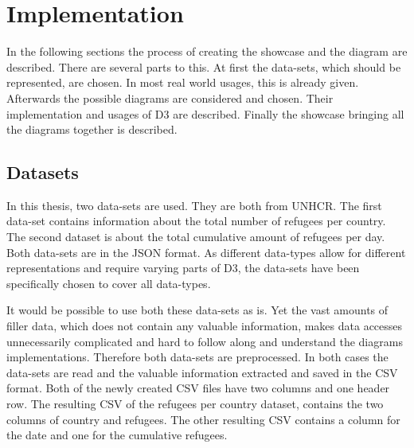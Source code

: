 \chapter{Implementation}


In the following sections the process of creating the showcase and the diagram are described. There are several parts to this. At first the data-sets, which should be represented, are chosen. In most real world usages, this is already given. Afterwards the possible diagrams are considered and chosen. Their implementation and usages of D3 are described. Finally the showcase bringing all the diagrams together is described.

\section{Datasets}

In this thesis, two data-sets are used. They are both from UNHCR\cite{unhcr}. The first data-set contains information about the total number of refugees per country\cite{unhcr_rpc}. The second dataset is about the total cumulative amount of refugees per day\cite{unhcr_rpd}. Both data-sets are in the JSON format.
As different data-types allow for different representations and require varying parts of D3, the data-sets have been specifically chosen to cover all data-types.


It would be possible to use both these data-sets as is. Yet the vast amounts of filler data, which does not contain any valuable information, makes data accesses unnecessarily complicated and hard to follow along and understand the diagrams implementations. Therefore both data-sets are preprocessed. In both cases the data-sets are read and the valuable information extracted and saved in the CSV format. Both of the newly created CSV files have two columns and one header row. The resulting CSV of the refugees per country dataset, contains the two columns of country and refugees. The other resulting CSV contains a column for the date and one for the cumulative refugees. 

